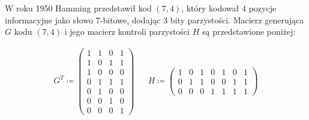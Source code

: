 W roku 1950 Hamming przedstawił kod $(7,4)$, który kodował 4 pozycje informacyjne jako słowo 7-bitowe,
dodając 3 bity parzystości.
Macierz generująca $G$ kodu $(7,4)$ i jego macierz kontroli parzystości $H$ są przedstawione poniżej:


\begin{align*}
    G^{T} \coloneqq \begin{pmatrix}
                        1 & 1 & 0 & 1 \\
                        1 & 0 & 1 & 1 \\
                        1 & 0 & 0 & 0 \\
                        0 & 1 & 1 & 1 \\
                        0 & 1 & 0 & 0 \\
                        0 & 0 & 1 & 0 \\
                        0 & 0 & 0 & 1
    \end{pmatrix} & &
    H \coloneqq \begin{pmatrix}
                    1 & 0 & 1 & 0 & 1 & 0 & 1 \\
                    0 & 1 & 1 & 0 & 0 & 1 & 1 \\
                    0 & 0 & 0 & 1 & 1 & 1 & 1
    \end{pmatrix}
\end{align*}

